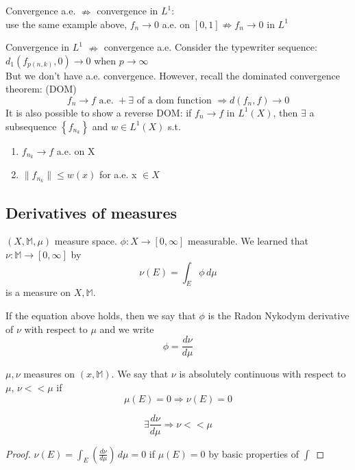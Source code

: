 Convergence a.e. \(\nRightarrow\) convergence in \(L^1\): \\
use the same example above, \(f_n \rightarrow 0\) a.e. on \([0, 1] \nRightarrow f_n \rightarrow 0\) in \(L^1\)

Convergence in \(L^1\) \(\nRightarrow\) convergence a.e.
Consider the typewriter sequence: \( d_1(f_{p(n, k)}, 0) \to 0\) when \( p \to\infty\) \\
But we don't have a.e. convergence. However, recall the dominated convergence theorem: (DOM)
\[ f_n \rightarrow f \text{ a.e. }  + \exists \text{ of a dom function } \Rightarrow d(f_n, f)\rightarrow 0 \]
It is also possible to show a reverse DOM:
if \(f_n \to f \) in \(L^1(X)\), then \(\exists\) a subsequence \(\left\{f_{n_k}\right\}\) and \(w \in L^1(X)\) s.t. 
\begin{enumerate}
    \item \(f_{n_k} \rightarrow f\) a.e. on X
    \item \(\| f_{n_k} \| \leq w(x) \) for a.e. x \(\in X\)
\end{enumerate}

\subsection*{Derivatives of measures}
\(\left(X, \mathbb{M}, \mu \right)\) measure space. 
\(\phi : X \to \left[0, \infty \right]\) measurable. 
We learned that \(\nu: \mathbb{M} \to \left[0, \infty \right]\) by \[\nu(E)= \int_E \phi \, d\mu\] is a measure on \(X, \mathbb{M}\).

If the equation above holds, then we say that \(\phi \) is the Radon Nykodym derivative of \(\nu\) with respect to \(\mu\) and we write \[\phi = \frac{d\nu}{d\mu}\]
\begin{definition}
    \(\mu, \nu  \) measures on \(\left(x, \mathbb{M}\right)\). We say that \(\nu\) is absolutely continuous with respect to \(\mu\), \(\nu << \mu \) if 
    \[\mu(E) = 0 \Rightarrow \nu(E)=0\]
\end{definition}

\begin{lemma}
    \[ \exists \frac{d \nu}{d \mu} \Rightarrow \nu << \mu \]
\end{lemma}

\begin{proof}
    \(\nu(E) = \int_E (\frac{d\nu}{d\mu}) \, d\mu = 0\) if \(\mu(E)=0\) by basic properties of \(\int\)
\end{proof}

